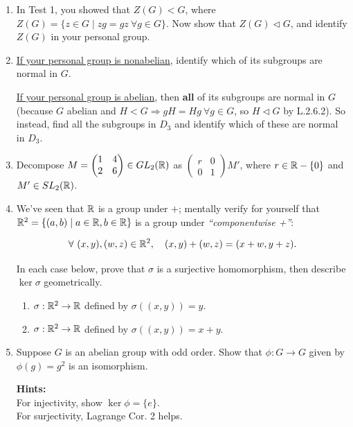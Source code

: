 \begin{enumerate}
    \item In Test 1, you showed that $ Z(G) < G $, where $ Z(G) = \{ z \in G \mid zg = gz \ \forall g \in G \} $. Now show that $ Z(G) \triangleleft G $, and identify $ Z(G) $ in your personal group. \\ \steezybreak

    \item \ul{If your personal group is nonabelian}, identify which of its subgroups are normal in $ G $.

    \ul{If your personal group is abelian}, then \textbf{all} of its subgroups are normal in $ G $ (because $ G $ abelian and $ H < G \Rightarrow gH = Hg \ \forall g \in G $, so $ H \triangleleft G $ by L.2.6.2). So instead, find all the subgroups in $ D_3 $ and identify which of these are normal in $ D_3 $. \\ \steezybreak


    \item Decompose $ M = \begin{pmatrix} 1 & 4 \\ 2 & 6 \end{pmatrix} \in GL_2({\mathbb{R}}) $ as $ \begin{pmatrix} r & 0 \\ 0 & 1 \end{pmatrix} M' $, where $ r \in {\mathbb{R}} - \{0\} $ and $ M' \in SL_2({\mathbb{R}}) $. \\ \steezybreak
     

    \item We've seen that $ {\mathbb{R}} $ is a group under $ + $; mentally verify for yourself that $ {\mathbb{R}}^2 = \{(a,b) \mid a \in {\mathbb{R}}, b \in {\mathbb{R}} \} $ is a group under \textit{``componentwise +''}:
    
    \[
    \forall \ (x,y), (w,z) \in {\mathbb{R}}^2, \quad (x,y) + (w,z) = (x+w, y+z).
    \]
    
    In each case below, prove that $ \sigma $ is a surjective homomorphism, then describe $ \ker \sigma $ geometrically.
    
    \begin{enumerate}
        \item $ \sigma: {\mathbb{R}}^2 \to {\mathbb{R}} $ defined by $ \sigma((x,y)) = y $.
        \item $ \sigma: {\mathbb{R}}^2 \to {\mathbb{R}} $ defined by $ \sigma((x,y)) = x+y $. \\ \steezybreak
        
    \end{enumerate} 

    \item Suppose $ G $ is an abelian group with odd order. Show that $ \phi: G \to G $ given by $ \phi(g) = g^2 $ is an isomorphism.

    \textbf{Hints:} \\
    For injectivity, show $ \ker \phi = \{e\} $. \\
    For surjectivity, Lagrange Cor. 2 helps.
\end{enumerate}
\newpage

